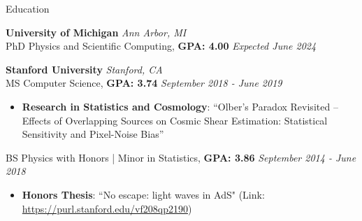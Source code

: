 \begin{rSection}{Education}

{\bf University of Michigan} \hfill {\em Ann Arbor, MI} 
\\ PhD Physics and Scientific Computing, \textbf{GPA: 4.00} \hfill {\em Expected June 2024}
\vspace*{-0.1cm}
%

{\bf Stanford University} \hfill {\em Stanford, CA} 
\\ MS Computer Science, \textbf{GPA: 3.74} \hfill {\em September 2018 - June 2019}

\vspace*{-0.1cm}
%
\begin{itemize}[itemsep=-0.3em] %

    \item 
    \textbf{Research in Statistics and Cosmology}: ``Olber’s Paradox Revisited – Effects of Overlapping Sources on Cosmic Shear Estimation:  Statistical Sensitivity and Pixel-Noise Bias''
\end{itemize}

%
BS Physics with Honors | Minor in Statistics, \textbf{GPA: 3.86} \hfill {\em September 2014 - June 2018}
%
\vspace*{-0.1cm}
\begin{itemize}[itemsep=-0.25em] 

    \item 
    \textbf{Honors Thesis}: ``No escape: light waves in AdS" (Link: \url{https://purl.stanford.edu/vf208qp2190})  

\end{itemize}
%
\vspace*{-0.1cm}
\end{rSection}


